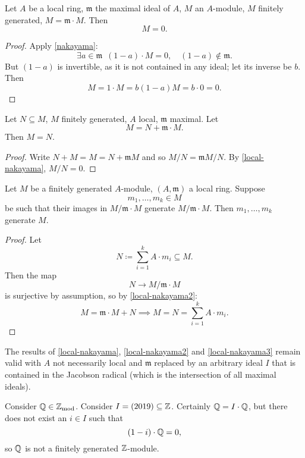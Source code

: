 \begin{corollary}
  \label{local-nakayama}
  Let $A$ be a local ring, $\mathfrak m$ the maximal ideal of $A$, $M$ an $A$-module, $M$ finitely generated, $M = \mathfrak m \cdot M$. Then
  \[ M = 0.\]
\end{corollary}
\begin{proof}
  Apply \cref{nakayama}:
  \[ \exists a \in \mathfrak m \enspace (1-a) \cdot M = 0, \quad (1-a) \notin \mathfrak m.\]
  But $(1 - a)$ is invertible, as it is not contained in any ideal; let its inverse be $b$. Then
  \[ M = 1 \cdot M = b(1-a) M = b \cdot 0 = 0.\]
\end{proof}

\begin{corollary}
  \label{local-nakayama2}
  Let $N \subseteq M$, $M$ finitely generated, $A$ local, $\mathfrak m$ maximal. Let
  \[ M = N + \mathfrak m \cdot M.\]
  Then $M = N$.
\end{corollary}
\begin{proof}
  Write
  \(N + M = M = N + \mathfrak m M\)
  and so
  \(M /{N} = \mathfrak m M /{N}.\)
  By \cref{local-nakayama},
  $M / {N} = 0$.
\end{proof}

\begin{corollary}
  \label{local-nakayama3}
  Let $M$ be a finitely generated $A$-module, $(A, \mathfrak m)$ a local ring. Suppose
  \[ m_1, \dotsc, m_k \in M\]
  be such that their images in $M / {\mathfrak m \cdot M}$ generate $M / {\mathfrak m \cdot M}$. Then $m_1, \dotsc, m_k$ generate $M$.
\end{corollary}
\begin{proof}
  Let
  \[ N \coloneqq \sum_{i=1}^k A \cdot m_i \subseteq M.\]
  Then the map
  \[ N \to M / {\mathfrak m \cdot M}\]
  is surjective by assumption, so by \cref{local-nakayama2}:
  \[ M = \mathfrak m \cdot M + N \implies M = N = \sum_{i=1}^k A \cdot m_i.\]
\end{proof}

\begin{note}
  The results of \cref{local-nakayama}, \cref{local-nakayama2} and \cref{local-nakayama3} remain valid with \(A\) not necessarily local and \(\mathfrak{m}\) replaced by an arbitrary ideal \(I\) that is contained in the Jacobson radical (which is the intersection of all maximal ideals).
\end{note}

\begin{example}
  Consider $\mathbb Q \in {\mathbb Z}_\mathrm{mod}$. Consider $I = (2019) \subseteq \mathbb Z$.
  Certainly $\mathbb Q = I \cdot \mathbb Q$, but there does not exist an $i \in I$ such that
  \[ (1-i) \cdot \mathbb Q = 0,\]
  so $\mathbb Q$ is not a finitely generated $\mathbb Z$-module. 
\end{example}

